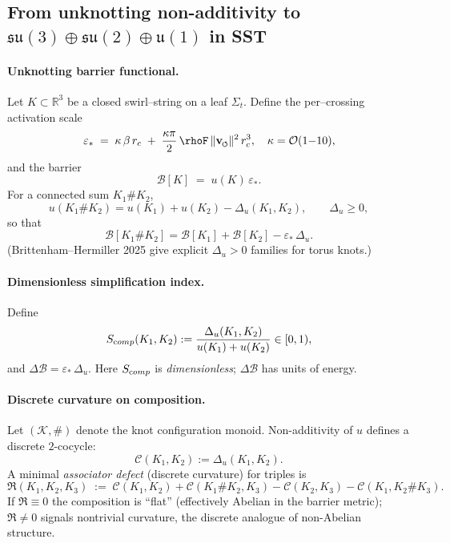 \documentclass[11pt]{article}
\begin{document}

        \subsection*{From unknotting non-additivity to \(\mathfrak{su}(3)\oplus\mathfrak{su}(2)\oplus\mathfrak u(1)\) in SST}

        \paragraph{Unknotting barrier functional.}
            Let \(K\subset\mathbb R^3\) be a closed swirl–string on a leaf \(\Sigma_t\).
            Define the per–crossing activation scale
            \[
                \varepsilon_*\;=\;\kappa\,\beta\,\rc\;+\;\frac{\kappa\pi}{2}\,\rhoF\,\vnorm^2\,\rc^3,
                \quad \kappa=\mathcal O(1{-}10),
            \]
            and the barrier
            \[
                \mathcal B[K]\;=\;u(K)\,\varepsilon_*.
            \]
            For a connected sum \(K_1\#K_2\),
            \[
                u(K_1\#K_2)=u(K_1)+u(K_2)-\Delta_u(K_1,K_2),\qquad \Delta_u\ge 0,
            \]
            so that
            \[
                \mathcal B[K_1\#K_2]=\mathcal B[K_1]+\mathcal B[K_2]-\varepsilon_*\,\Delta_u.
            \]
            (Brittenham–Hermiller 2025 give explicit \(\Delta_u>0\) families for torus knots.)

        \paragraph{Dimensionless simplification index.}
            Define
            \[
                S_{\textrm comp}(K_1,K_2):=\frac{\Delta_u(K_1,K_2)}{u(K_1)+u(K_2)}\in[0,1),
            \]
            and \(\Delta\mathcal B=\varepsilon_*\,\Delta_u\). Here \(S_{\textrm comp}\) is \emph{dimensionless}; \(\Delta\mathcal B\) has units of energy.

        \paragraph{Discrete curvature on composition.}
            Let \((\mathcal K,\#)\) denote the knot configuration monoid. Non-additivity of \(u\) defines a discrete \(2\)-cocycle:
            \[
                \mathcal C(K_1,K_2):=\Delta_u(K_1,K_2).
            \]
            A minimal \emph{associator defect} (discrete curvature) for triples is
            \[
                \mathfrak{R}(K_1,K_2,K_3)\;:=\;
                \mathcal C(K_1,K_2)+\mathcal C(K_1\#K_2,K_3)
                -\mathcal C(K_2,K_3)-\mathcal C(K_1,K_2\#K_3).
            \]
            If \(\mathfrak{R}\equiv 0\) the composition is “flat” (effectively Abelian in the barrier metric); \(\mathfrak{R}\neq 0\) signals nontrivial curvature, the discrete analogue of non-Abelian structure.
\end{document}
